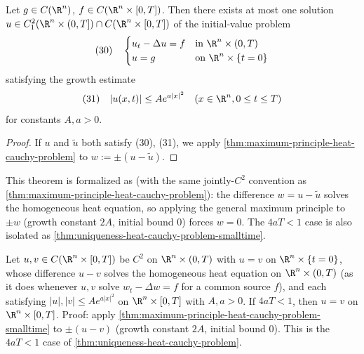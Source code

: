 \begin{theorem}
\label{thm:uniqueness-heat-cauchy-problem}
\leanok
Let $g \in C(\R^n)$, $f \in C(\R^n \times [0,T])$. Then there exists at most one solution $u \in C^2_1(\R^n \times (0,T]) \cap C(\R^n \times [0,T])$ of the initial-value problem
$$(30) \quad \begin{cases} u_t - \Delta u = f & \text{in } \R^n \times (0,T) \\ u = g & \text{on } \R^n \times \{t = 0\} \end{cases}$$
satisfying the growth estimate
$$(31) \quad |u(x,t)| \leq Ae^{a|x|^2} \quad (x \in \R^n, 0 \leq t \leq T)$$
for constants $A, a > 0$.
\end{theorem}

\begin{proof}
If $u$ and $\tilde{u}$ both satisfy (30), (31), we apply \cref{thm:maximum-principle-heat-cauchy-problem} to $w := \pm(u - \tilde{u})$.
\end{proof}

This theorem is formalized as  (with the same
jointly-$C^2$ convention as \cref{thm:maximum-principle-heat-cauchy-problem}): the
difference $w = u - \tilde u$ solves the homogeneous heat equation, so applying the general
maximum principle to $\pm w$ (growth constant $2A$, initial bound $0$) forces $w = 0$. The
$4aT<1$ case is also isolated as
\cref{thm:uniqueness-heat-cauchy-problem-smalltime}.

\begin{theorem}
\label{thm:uniqueness-heat-cauchy-problem-smalltime}
\leanok
Let $u, v \in C(\R^n \times [0,T])$ be $C^2$ on $\R^n \times (0,T)$ with $u = v$ on
$\R^n \times \{t=0\}$, whose difference $u - v$ solves the homogeneous heat equation on
$\R^n \times (0,T)$ (as it does whenever $u,v$ solve $w_t - \Delta w = f$ for a common
source $f$), and each satisfying $|u|,|v| \le A e^{a|x|^2}$ on $\R^n \times [0,T]$ with
$A,a > 0$. If $4aT < 1$, then $u = v$ on $\R^n \times [0,T]$. Proof: apply
\cref{thm:maximum-principle-heat-cauchy-problem-smalltime} to $\pm(u-v)$ (growth constant
$2A$, initial bound $0$). This is the $4aT<1$ case of
\cref{thm:uniqueness-heat-cauchy-problem}.
\end{theorem}

